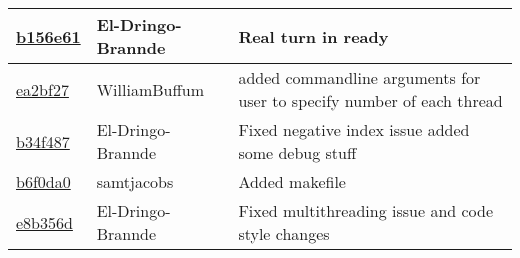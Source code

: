 \begin{tabular}{l l l}
\href{https://github.com/El-Dringo-Brannde/CS444/commit/b156e61fdf6792555162b1e4dcd74d6cd2be8e0f}{b156e61} & El-Dringo-Brannde & Real turn in ready\\\hline
\href{https://github.com/El-Dringo-Brannde/CS444/commit/ea2bf27826aeaca0e6569fe4f30d000e668cf2f9}{ea2bf27} & WilliamBuffum & added commandline arguments for user to specify number of each thread\\\hline
\href{https://github.com/El-Dringo-Brannde/CS444/commit/b34f487448d60dbf56a5fd32ce0b26f427761d85}{b34f487} & El-Dringo-Brannde & Fixed negative index issue added some debug stuff\\\hline
\href{https://github.com/El-Dringo-Brannde/CS444/commit/b6f0da086658854d9b7f1fff40dddab9daa5fd8d}{b6f0da0} & samtjacobs & Added makefile\\\hline
\href{https://github.com/El-Dringo-Brannde/CS444/commit/e8b356d587abec4a48ff17831b3add9dd65beed8}{e8b356d} & El-Dringo-Brannde & Fixed multithreading issue and code style changes\\\hline\end{tabular}
